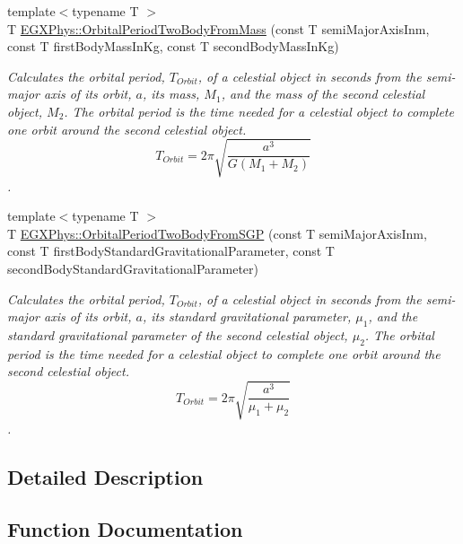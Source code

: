 \begin{DoxyCompactItemize}
{\footnotesize template$<$typename T $>$ }\\T \mbox{\hyperlink{group___e_g_x_phys-_astrophysic-_orbital_period_ga6ec6ae4e31d99bf4d1a27f708dd3247d}{E\+G\+X\+Phys\+::\+Orbital\+Period\+Two\+Body\+From\+Mass}} (const T semi\+Major\+Axis\+Inm, const T first\+Body\+Mass\+In\+Kg, const T second\+Body\+Mass\+In\+Kg)
\begin{DoxyCompactList}\small\item\em Calculates the orbital period, $T_{Orbit}$, of a celestial object in seconds from the semi-\/major axis of its orbit, $a$, its mass, $M_1$, and the mass of the second celestial object, $M_2$. The orbital period is the time needed for a celestial object to complete one orbit around the second celestial object. \[ T_{Orbit}=2\pi\sqrt{\dfrac{a^3}{G(M_1 + M_2)}}\]. \end{DoxyCompactList}\item 
{\footnotesize template$<$typename T $>$ }\\T \mbox{\hyperlink{group___e_g_x_phys-_astrophysic-_orbital_period_ga53ff53aea547ddedfc69119c4830daea}{E\+G\+X\+Phys\+::\+Orbital\+Period\+Two\+Body\+From\+S\+GP}} (const T semi\+Major\+Axis\+Inm, const T first\+Body\+Standard\+Gravitational\+Parameter, const T second\+Body\+Standard\+Gravitational\+Parameter)
\begin{DoxyCompactList}\small\item\em Calculates the orbital period, $T_{Orbit}$, of a celestial object in seconds from the semi-\/major axis of its orbit, $a$, its standard gravitational parameter, $\mu_1$, and the standard gravitational parameter of the second celestial object, $\mu_2$. The orbital period is the time needed for a celestial object to complete one orbit around the second celestial object. \[ T_{Orbit}=2\pi\sqrt{\dfrac{a^3}{\mu_1 + \mu_2}}\]. \end{DoxyCompactList}\end{DoxyCompactItemize}


\subsection{Detailed Description}


\subsection{Function Documentation}
\mbox{\label{group___e_g_x_phys-_astrophysic-_orbital_period_ga76aac7afe3b7a30a785259e9eeb0c139}} 
